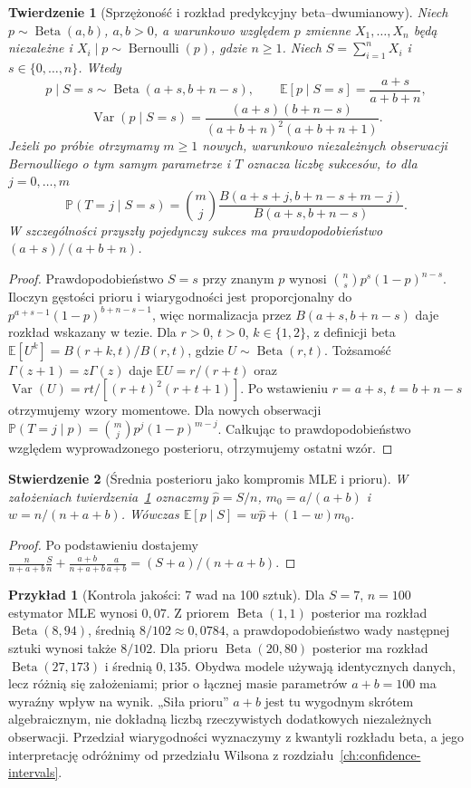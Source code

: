 \documentclass[11pt,a4paper,oneside]{report}
\numberwithin{equation}{chapter}
\theoremstyle{plain}
\newtheorem{twierdzenie}{Twierdzenie}[chapter]
\newtheorem{stwierdzenie}[twierdzenie]{Stwierdzenie}
\theoremstyle{definition}
\newtheorem{przyklad}{Przykład}[chapter]
\theoremstyle{remark}
\newcommand{\Prob}{\mathbb P}
\newcommand{\E}{\mathbb E}
\newcommand{\Var}{\operatorname{Var}}
\begin{document}
\begin{twierdzenie}[Sprzężoność i rozkład predykcyjny beta--dwumianowy]
\label{thm:beta-binomial}
Niech $p\sim\operatorname{Beta}(a,b)$, $a,b>0$, a warunkowo
względem $p$ zmienne $X_1,\ldots,X_n$ będą niezależne
i $X_i\mid p\sim\operatorname{Bernoulli}(p)$, gdzie $n\ge1$.
Niech $S=\sum_{i=1}^nX_i$ i $s\in\{0,\ldots,n\}$.
Wtedy
\[
 p\mid S=s\sim\operatorname{Beta}(a+s,b+n-s),\qquad
 \E[p\mid S=s]=\frac{a+s}{a+b+n},
\]
\[
 \Var(p\mid S=s)=\frac{(a+s)(b+n-s)}{(a+b+n)^2(a+b+n+1)}.
\]
Jeżeli po próbie otrzymamy $m\ge1$ nowych, warunkowo niezależnych
obserwacji Bernoulliego o tym samym parametrze i
$T$ oznacza liczbę sukcesów, to dla $j=0,\ldots,m$
\[
 \Prob(T=j\mid S=s)
 =\binom mj\frac{B(a+s+j,b+n-s+m-j)}{B(a+s,b+n-s)}.
\]
W szczególności przyszły pojedynczy sukces ma prawdopodobieństwo
$(a+s)/(a+b+n)$.
\end{twierdzenie}
\begin{proof}
Prawdopodobieństwo $S=s$ przy znanym $p$ wynosi
$\binom ns p^s(1-p)^{n-s}$. Iloczyn gęstości prioru i
wiarygodności jest proporcjonalny do
$p^{a+s-1}(1-p)^{b+n-s-1}$, więc normalizacja przez
$B(a+s,b+n-s)$ daje rozkład wskazany w tezie.
Dla $r>0$, $t>0$, $k\in\{1,2\}$, z definicji beta
$\E[U^k]=B(r+k,t)/B(r,t)$, gdzie
$U\sim\operatorname{Beta}(r,t)$. Tożsamość
$\Gamma(z+1)=z\Gamma(z)$ daje
$\E U=r/(r+t)$ oraz $\Var(U)=rt/[(r+t)^2(r+t+1)]$.
Po wstawieniu $r=a+s$, $t=b+n-s$ otrzymujemy wzory
momentowe. Dla nowych obserwacji
$\Prob(T=j\mid p)=\binom mjp^j(1-p)^{m-j}$.
Całkując to prawdopodobieństwo względem wyprowadzonego
posterioru, otrzymujemy ostatni wzór.
\end{proof}

\begin{stwierdzenie}[Średnia posterioru jako kompromis MLE i prioru]
\label{prop:beta-shrinkage}
W założeniach twierdzenia~\ref{thm:beta-binomial} oznaczmy
$\widehat p=S/n$, $m_0=a/(a+b)$ i $w=n/(n+a+b)$.
Wówczas $\E[p\mid S]=w\widehat p+(1-w)m_0$.
\end{stwierdzenie}
\begin{proof}
Po podstawieniu dostajemy
$\frac{n}{n+a+b}\frac Sn+
\frac{a+b}{n+a+b}\frac{a}{a+b}=(S+a)/(n+a+b)$.
\end{proof}

\begin{przyklad}[Kontrola jakości: 7 wad na 100 sztuk]
Dla $S=7$, $n=100$ estymator MLE wynosi $0{,}07$.
Z priorem $\operatorname{Beta}(1,1)$ posterior ma rozkład
$\operatorname{Beta}(8,94)$, średnią $8/102\approx0{,}0784$,
a prawdopodobieństwo wady następnej sztuki wynosi także $8/102$.
Dla prioru $\operatorname{Beta}(20,80)$ posterior ma rozkład
$\operatorname{Beta}(27,173)$ i średnią $0{,}135$.
Obydwa modele używają identycznych danych, lecz różnią się
założeniami; prior o łącznej masie parametrów $a+b=100$
ma wyraźny wpływ na wynik. „Siła prioru” $a+b$ jest tu
wygodnym skrótem algebraicznym, nie dokładną liczbą
rzeczywistych dodatkowych niezależnych obserwacji.
Przedział wiarygodności wyznaczymy z kwantyli rozkładu beta,
a jego interpretację odróżnimy od przedziału Wilsona z
rozdziału~\ref{ch:confidence-intervals}.
\end{przyklad}
\end{document}
